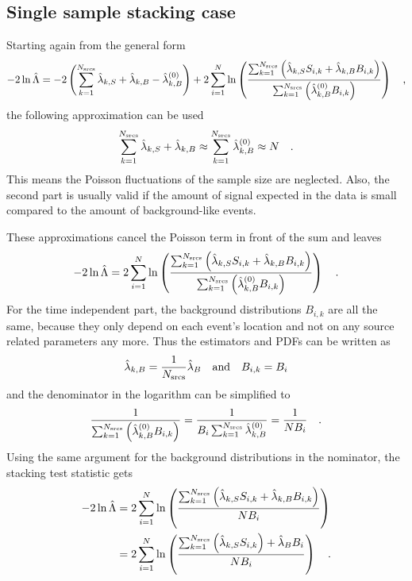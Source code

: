 \subsection{Single sample stacking case}
Starting again from the general form
\begin{equation}
  -2\ln\hat{\Lambda}
  = -2\left(\sum_{k=1}^{N_\text{srcs}}\hat{\lambda}_{k,S} +
                                      \hat{\lambda}_{k,B} -
                                      \hat{\lambda}_{k,B}^{(0)}\right) +
    2\sum_{i=1}^N \ln\left(
      \frac{\sum_{k=1}^{N_\text{srcs}}\left(
          \hat{\lambda}_{k,S} S_{i,k}+\hat{\lambda}_{k,B} B_{i,k}\right)}
          {\sum_{k=1}^{N_\text{srcs}}\left(
            \hat{\lambda}_{k,B}^{(0)} B_{i,k}
          \right)}
        \right)
  \quad\text{,}
\end{equation}
the following approximation can be used
\begin{equation}
  \sum_{k=1}^{N_\text{srcs}} \hat{\lambda}_{k,S} + \hat{\lambda}_{k,B} \approx
    \sum_{k=1}^{N_\text{srcs}} \hat{\lambda}_{k,B}^{(0)} \approx N
  \quad\text{.}
\end{equation}
This means the Poisson fluctuations of the sample size are neglected.
Also, the second part is usually valid if the amount of signal expected in the data is small compared to the amount of background-like events.

These approximations cancel the Poisson term in front of the sum and leaves
\begin{equation}
  -2\ln\hat{\Lambda}
  = 2\sum_{i=1}^N \ln\left(
    \frac{\sum_{k=1}^{N_\text{srcs}}\left(
          \hat{\lambda}_{k,S} S_{i,k}+\hat{\lambda}_{k,B} B_{i,k}\right)}
          {\sum_{k=1}^{N_\text{srcs}}\left(
            \hat{\lambda}_{k,B}^{(0)} B_{i,k} \right)}
        \right)
  \quad\text{.}
\end{equation}
For the time independent part, the background distributions $B_{i,k}$ are all the same, because they only depend on each event's location and not on any source related parameters any more.
Thus the estimators and PDFs can be written as
\begin{equation}
  \hat{\lambda}_{k,B} = \frac{1}{N_\text{srcs}} \hat{\lambda}_B
  \quad\text{and}\quad B_{i,k} = B_i
\end{equation}
and the denominator in the logarithm can be simplified to
\begin{equation}
  \frac{1}{\sum_{k=1}^{N_\text{srcs}}\left(
           \hat{\lambda}_{k,B}^{(0)}B_{i,k} \right)}
  = \frac{1}{B_i \sum_{k=1}^{N_\text{srcs}}\hat{\lambda}_{k,B}^{(0)}}
  = \frac{1}{N B_i}
  \quad\text{.}
\end{equation}
Using the same argument for the background distributions in the nominator, the stacking test statistic gets
\begin{align}
  -2\ln\hat{\Lambda}
  &= 2\sum_{i=1}^N \ln\left(
    \frac{\sum_{k=1}^{N_\text{srcs}}\left(
          \hat{\lambda}_{k,S} S_{i,k}+\hat{\lambda}_{k,B} B_{i,k}\right)}
          {N B_i} \right) \\
  &= 2\sum_{i=1}^N \ln\left(
    \frac{\sum_{k=1}^{N_\text{srcs}}\left(\hat{\lambda}_{k,S} S_{i,k}\right) +
          \hat{\lambda}_B B_i}{N B_i} \right)
  \quad\text{.}
\end{align}


